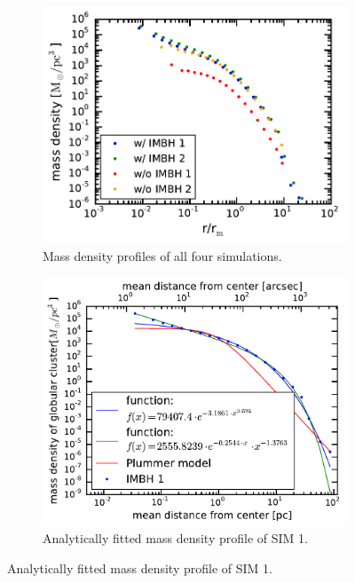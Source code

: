 \begin{figure}[htbp]
	\centering
	\begin{subfigure}{0.475\textwidth}
		\centering
		\includegraphics[width=\textwidth]{Plots/density_profiles.pdf}
		\caption{Mass density profiles of all four simulations.}
		\label{fig:mass_dens_points}
	\end{subfigure}
	\hfill
	\begin{subfigure}{0.475\textwidth}
		\centering
		\includegraphics[width=\textwidth]{Plots/density_prof_analytic.pdf}
		\caption{Analytically fitted mass density profile of SIM 1.}
		\label{fig:mass_dens_ana}
	\end{subfigure}

\end{figure}
